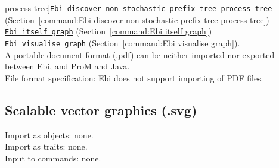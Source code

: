 {process-tree]{\texttt{Ebi discover-non-stochastic prefix-tree process-tree}} (Section~\ref{command:Ebi discover-non-stochastic prefix-tree process-tree})\\\null\qquad\hyperref[command:Ebi itself graph]{\texttt{Ebi itself graph}} (Section~\ref{command:Ebi itself graph})\\\null\qquad\hyperref[command:Ebi visualise graph]{\texttt{Ebi visualise graph}} (Section~\ref{command:Ebi visualise graph}).
\\A portable document format (.pdf) can be neither imported nor exported between Ebi, and ProM and Java.
\\File format specification:
Ebi does not support importing of PDF files.
\clearpage
\subsection{Scalable vector graphics (.svg)}
\label{filehandler:scalable vector graphics}
Import as objects: none.
\\Import as traits: none.
\\Input to commands: none.
}
